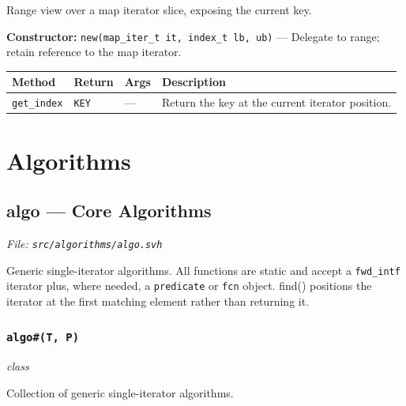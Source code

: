 \documentclass[11pt,letterpaper]{report}
\begin{document}
Range view over a map iterator slice, exposing the current key.

\noindent\textbf{Constructor:} \texttt{new(map\_iter\_t it, index\_t lb, ub)} --- Delegate to range; retain reference to the map iterator.

\begin{xltabular}{\linewidth}{>{\small}p{1.35in} >{\small}p{1.25in} >{\small}p{0.95in} >{\small}X}
\toprule
\textbf{Method} & \textbf{Return} & \textbf{Args} & \textbf{Description} \\
\midrule
\endhead
\bottomrule
\endfoot
\texttt{get\_index} & \texttt{KEY} & --- & Return the key at the current iterator position. \\
\end{xltabular}

\chapter{Algorithms}
\section{algo --- Core Algorithms}
\noindent\small\textit{File: \texttt{src/algorithms/algo.svh}}\par

Generic single-iterator algorithms. All functions are static and accept a \texttt{fwd\_intf} iterator plus, where needed, a \texttt{predicate} or \texttt{fcn} object. find() positions the iterator at the first matching element rather than returning it.

\subsection*{\texttt{algo\#(T, P)}}
\noindent\small\textit{class}\par

Collection of generic single-iterator algorithms.
\end{document}
